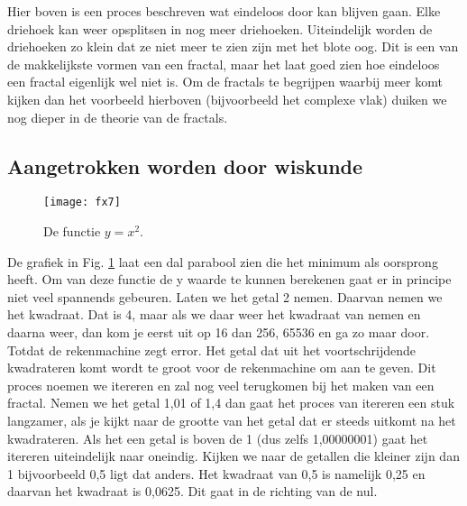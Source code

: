 \documentclass[11pt,fleqn]{book} %
\begin{document}
Hier boven is een proces beschreven wat eindeloos door kan blijven gaan. Elke driehoek kan weer opsplitsen in nog meer driehoeken. Uiteindelijk worden de driehoeken zo klein dat ze niet meer te zien zijn met het blote oog. Dit is een van de makkelijkste vormen van een fractal, maar het laat goed zien hoe eindeloos een fractal eigenlijk wel niet is.
Om de fractals te begrijpen waarbij meer komt kijken dan het voorbeeld hierboven (bijvoorbeeld het complexe vlak) duiken we nog dieper in de theorie van de fractals.

\subsection{Aangetrokken worden door wiskunde}
\begin{figure}[h]
	\centering\texttt{[image: fx7]}
	\caption{De functie $y=x^2$.}
	\label{fig:fx7}
\end{figure}
De grafiek in Fig. \ref{fig:fx7} laat een dal parabool zien die het minimum als oorsprong heeft. Om van deze functie de y waarde te kunnen berekenen gaat er in principe niet veel spannends gebeuren. Laten we het getal 2 nemen. Daarvan nemen we het kwadraat. Dat is 4, maar als we daar weer het kwadraat van nemen en daarna weer, dan kom je eerst uit op 16 dan 256, 65536 en ga zo maar door. Totdat de rekenmachine zegt error. Het getal dat uit het voortschrijdende kwadrateren komt wordt te groot voor de rekenmachine om aan te geven. Dit proces noemen we itereren en zal nog veel terugkomen bij het maken van een fractal. Nemen we het getal 1,01 of 1,4 dan gaat het proces van itereren een stuk langzamer, als je kijkt naar de grootte van het getal dat er steeds uitkomt na het kwadrateren. Als het een getal is boven de 1 (dus zelfs 1,00000001) gaat het itereren uiteindelijk naar oneindig. Kijken we naar de getallen die kleiner zijn dan 1 bijvoorbeeld 0,5 ligt dat anders. Het kwadraat van 0,5 is namelijk 0,25 en daarvan het kwadraat is 0,0625. Dit gaat in de richting van de nul.
\end{document}
